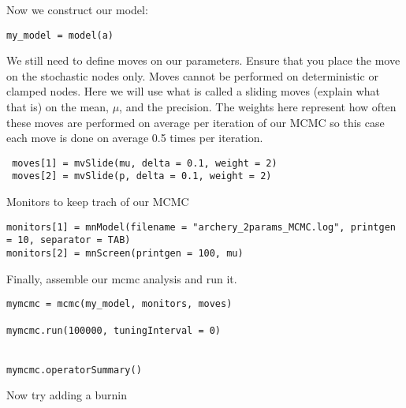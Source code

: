 Now we construct our model:

{\tt \begin{snugshade*}
 \begin{lstlisting}
my_model = model(a)
\end{lstlisting}
\end{snugshade*}}


We still need to define moves on our parameters. Ensure that you place the move on the stochastic nodes only. Moves cannot be performed on deterministic or clamped nodes. Here we will use what is called a sliding moves (explain what that is) on the mean, $\mu$, and the precision. The weights here represent how often these moves are performed on average per iteration of our MCMC so this case each move is done on average 0.5 times per iteration. 


{\tt \begin{snugshade*}
 \begin{lstlisting}
 moves[1] = mvSlide(mu, delta = 0.1, weight = 2)
 moves[2] = mvSlide(p, delta = 0.1, weight = 2)
 \end{lstlisting}
\end{snugshade*}}


Monitors to keep trach of our MCMC
{\tt \begin{snugshade*}
 \begin{lstlisting}
monitors[1] = mnModel(filename = "archery_2params_MCMC.log", printgen = 10, separator = TAB)
monitors[2] = mnScreen(printgen = 100, mu)
 \end{lstlisting}
\end{snugshade*}}

Finally, assemble our mcmc analysis and run it.

{\tt \begin{snugshade*}
 \begin{lstlisting}
mymcmc = mcmc(my_model, monitors, moves)

mymcmc.run(100000, tuningInterval = 0)


mymcmc.operatorSummary()
 \end{lstlisting}
\end{snugshade*}}

Now try adding a burnin



